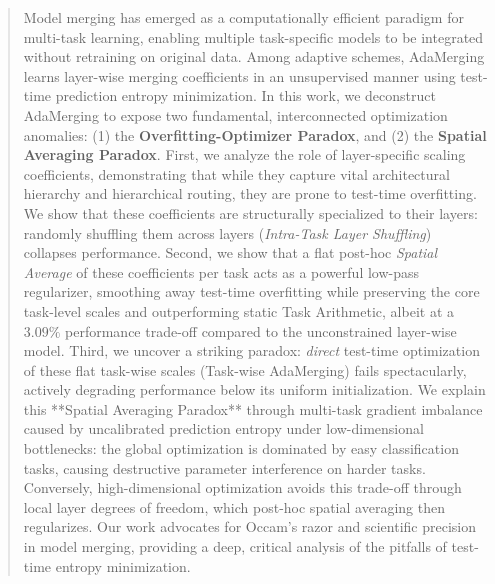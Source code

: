 \begin{abstract}
Model merging has emerged as a computationally efficient paradigm for multi-task learning, enabling multiple task-specific models to be integrated without retraining on original data. Among adaptive schemes, AdaMerging learns layer-wise merging coefficients in an unsupervised manner using test-time prediction entropy minimization. In this work, we deconstruct AdaMerging to expose two fundamental, interconnected optimization anomalies: (1) the \textbf{Overfitting-Optimizer Paradox}, and (2) the \textbf{Spatial Averaging Paradox}. First, we analyze the role of layer-specific scaling coefficients, demonstrating that while they capture vital architectural hierarchy and hierarchical routing, they are prone to test-time overfitting. We show that these coefficients are structurally specialized to their layers: randomly shuffling them across layers (\emph{Intra-Task Layer Shuffling}) collapses performance. Second, we show that a flat post-hoc \emph{Spatial Average} of these coefficients per task acts as a powerful low-pass regularizer, smoothing away test-time overfitting while preserving the core task-level scales and outperforming static Task Arithmetic, albeit at a $3.09\%$ performance trade-off compared to the unconstrained layer-wise model. Third, we uncover a striking paradox: \emph{direct} test-time optimization of these flat task-wise scales (Task-wise AdaMerging) fails spectacularly, actively degrading performance below its uniform initialization. We explain this **Spatial Averaging Paradox** through multi-task gradient imbalance caused by uncalibrated prediction entropy under low-dimensional bottlenecks: the global optimization is dominated by easy classification tasks, causing destructive parameter interference on harder tasks. Conversely, high-dimensional optimization avoids this trade-off through local layer degrees of freedom, which post-hoc spatial averaging then regularizes. Our work advocates for Occam's razor and scientific precision in model merging, providing a deep, critical analysis of the pitfalls of test-time entropy minimization.
\end{abstract}
